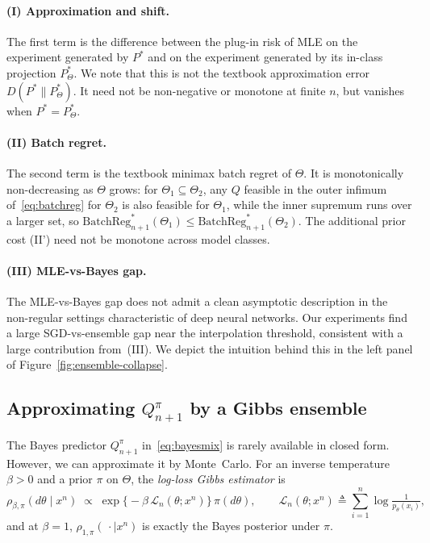 \paragraph{(I) Approximation and shift.}
The first term is the difference between the plug-in risk of MLE on the experiment
generated by $P^*$ and on the experiment generated by its in-class projection
$P^*_\Theta$. We note that this is not the textbook approximation error
$D(P^*\|P^*_\Theta)$. It need not be non-negative or monotone at finite $n$,
but vanishes when $P^*=P^*_\Theta$.

\paragraph{(II) Batch regret.}
The second term is the textbook minimax batch regret of $\Theta$. It is
monotonically non-decreasing as $\Theta$ grows: for $\Theta_1\subseteq\Theta_2$,
any $Q$ feasible in the outer infimum of~\eqref{eq:batchreg} for $\Theta_2$ is
also feasible for $\Theta_1$, while the inner supremum runs over a larger set,
so $\mathrm{BatchReg}^*_{n+1}(\Theta_1)\le\mathrm{BatchReg}^*_{n+1}(\Theta_2)$.
The additional prior cost (II') need not be monotone across model classes.

\paragraph{(III) MLE-vs-Bayes gap.}
The MLE-vs-Bayes gap does not admit a clean
asymptotic description in the non-regular settings characteristic of
deep neural networks. Our experiments find a large SGD-vs-ensemble gap
near the interpolation threshold, consistent with a large contribution
from~(III). We depict the
intuition behind this in the left panel of Figure~\ref{fig:ensemble-collapse}.

\subsection{Approximating $Q^\pi_{n+1}$ by a Gibbs ensemble}
\label{sec:gibbs}

The Bayes predictor $Q^\pi_{n+1}$ in~\eqref{eq:bayesmix} is rarely available in closed
form. However, we can approximate it by Monte~Carlo. For an inverse temperature $\beta>0$
and a prior $\pi$ on $\Theta$, the \emph{log-loss Gibbs estimator} is
\begin{equation}
\rho_{\beta,\pi}(d\theta\mid x^n)
\;\propto\; \exp\!\big\{-\beta\,\mathcal{L}_n(\theta;x^n)\big\}\,\pi(d\theta),
\qquad
\mathcal{L}_n(\theta;x^n)\triangleq \sum_{i=1}^n\log\tfrac{1}{p_\theta(x_i)},
\label{eq:gibbs}
\end{equation}
and at $\beta=1$, $\rho_{1,\pi}(\,\cdot\mid x^n)$ is exactly the Bayes posterior
under $\pi$.

